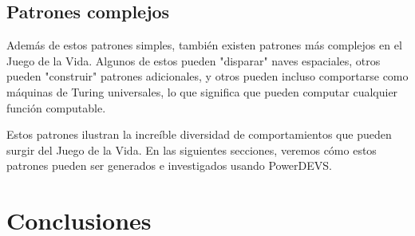 \documentclass[]{article}
\begin{document}

\subsection{Patrones complejos}
Además de estos patrones simples, también existen patrones más complejos en el Juego de la Vida. Algunos de estos pueden "disparar" naves espaciales, otros pueden "construir" patrones adicionales, y otros pueden incluso comportarse como máquinas de Turing universales, lo que significa que pueden computar cualquier función computable.


Estos patrones ilustran la increíble diversidad de comportamientos que pueden surgir del Juego de la Vida. En las siguientes secciones, veremos cómo estos patrones pueden ser generados e investigados usando PowerDEVS.



\section{Conclusiones}
\end{document}
